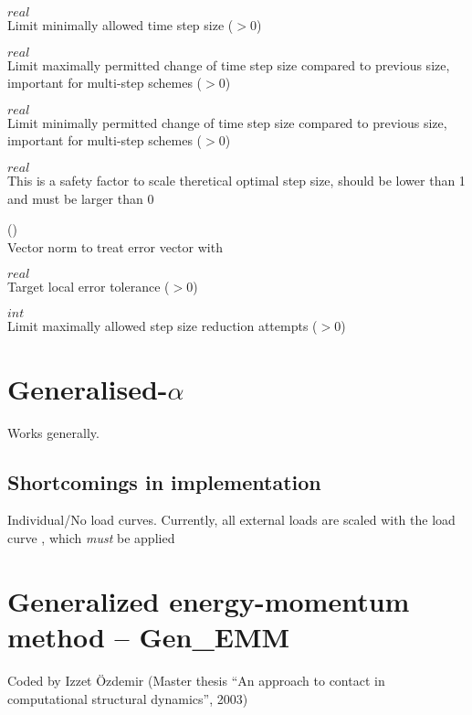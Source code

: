  $real$\\
Limit minimally allowed time step size ($>0$)

 $real$\\
Limit maximally permitted change of time step size compared to previous size, important for multi-step schemes ($>0$)

 $real$\\
Limit minimally permitted change of time step size compared to previous size, important for multi-step schemes ($>0$)

 $real$\\
This is a safety factor to scale theretical optimal step size, should be lower than 1 and must be larger than $0$

 (\kor{}\kor{}\kor{})\\
Vector norm to treat error vector with

 $real$\\
Target local error tolerance ($>0$)

 $int$\\
Limit maximally allowed step size reduction attempts ($>0$)

\section{Generalised-$\alpha$}

Works generally.

\subsection{Shortcomings in \ccarat implementation}
Individual/No load curves. Currently, all external loads are scaled with
  the load curve , which \emph{must} be applied


\section{Generalized energy-momentum method -- \ccarat{} Gen\_EMM}
Coded by Izzet \"{O}zdemir (Master thesis ``An approach to contact in
computational structural dynamics'', 2003)

